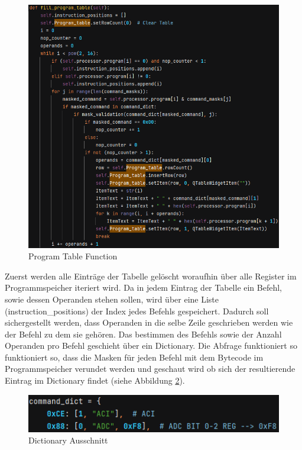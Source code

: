 \documentclass[12pt]{article}
\newcommand{\imgSpaceBefore}{\vspace{10pt}}
\begin{document}
\begin{figure}[H]
\centering
\includegraphics[width=14cm]{bilder/FillProgTable}
\caption{Program Table Function}
\label{fig:FillProgReg}
\end{figure}

\noindent
Zuerst werden alle Einträge der Tabelle gelöscht woraufhin über alle Register im Programmspeicher iteriert wird. Da in jedem Eintrag der Tabelle ein Befehl, sowie dessen Operanden stehen sollen, wird über eine Liste (instruction\_positions) der Index jedes Befehls gespeichert. Dadurch soll sichergestellt werden, dass Operanden in die selbe Zeile geschrieben werden wie der Befehl zu dem sie gehören. Das bestimmen des Befehls sowie der Anzahl Operanden pro Befehl geschieht über ein Dictionary. Die Abfrage funktioniert so funktioniert so, dass die Masken für jeden Befehl mit dem Bytecode im Programmspeicher verundet werden und geschaut wird ob sich der resultierende Eintrag im Dictionary findet (siehe Abbildung \ref{fig:Dict}).\imgSpaceBefore

\begin{figure}[H]
\centering
\includegraphics[width=12cm]{bilder/CmdDictExample}
\caption{Dictionary Ausschnitt}
\label{fig:Dict}
\end{figure}
\end{document}
